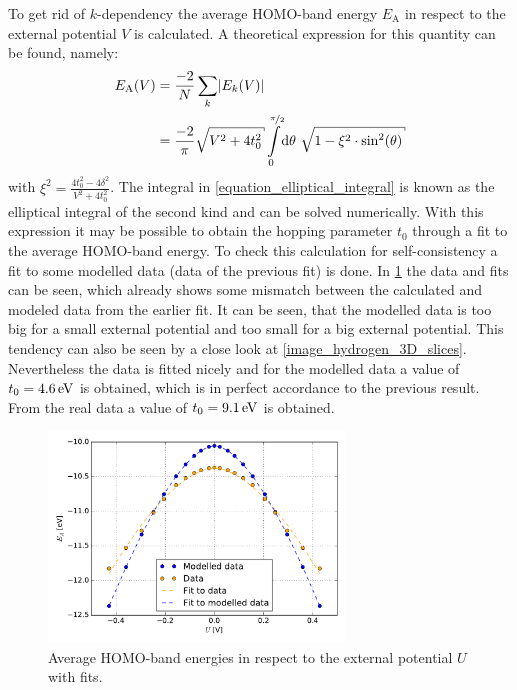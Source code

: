 To get rid of $k$-dependency the average HOMO-band energy $E_\text{A}$ in respect to the external potential $V$ is calculated. A theoretical expression for this quantity can be found, namely:
\begin{align}
	E_\text{A}(V) &= \frac{-2}{N}\sum_k \left|E_k(V)\right|\\
				  &= \frac{-2}{\pi}\sqrt{V^2+4t_0^2}\int\limits_0^{\nicefrac{\pi}{2}}\dd\theta\ \sqrt{1-\xi^2\cdot\sin^2(\theta)}
				  \label{equation_elliptical_integral}
\end{align}
with $\xi^2 = \frac{4t_0^2-4\delta^2}{V^2+4t_0^2}$. The integral in \cref{equation_elliptical_integral} is known as the elliptical integral of the second kind and can be solved numerically. With this expression it may be possible to obtain the hopping parameter $t_0$ through a fit to the average HOMO-band energy. To check this calculation for self-consistency a fit to some modelled data (data of the previous fit) is done. In \cref{image_hydrogen_homo_energy_charging} the data and fits can be seen, which already shows some mismatch between the calculated and modeled data from the earlier fit. It can be seen, that the modelled data is too big for a small external potential and too small for a big external potential. This tendency can also be seen by a close look at \cref{image_hydrogen_3D_slices}.\\
Nevertheless the data is fitted nicely and for the modelled data a value of $t_0 = \unit[4.6]{eV}$ is obtained, which is in perfect accordance to the previous result. From the real data a value of $t_0 = \unit[9.1]{eV}$ is obtained.\\
\begin{figure}[]
	\centering
	\includegraphics[width = 0.7\textwidth]{Images/Hydrogen/charging/Homo_energy_charge}
	\caption{Average HOMO-band energies in respect to the external potential $U$ with fits.}
	\label{image_hydrogen_homo_energy_charging}
\end{figure}
